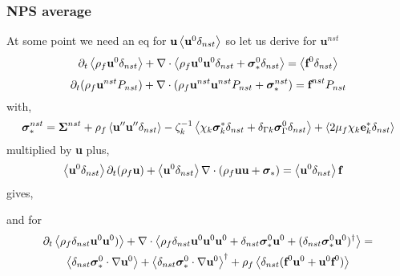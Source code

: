 \subsubsection{NPS average}

At some point we need an eq for $\textbf{u}\left<\textbf{u}^0 \delta_{nst}\right>$ so let us derive for $\textbf{u}^{nst}$
\begin{equation}
    \partial_t \left<\rho_f\textbf{u}^0\delta_{nst}\right>
    + \mathbf{\nabla}\cdot \left<\rho_f \textbf{u}^0\textbf{u}^0\delta_{nst} + \bm\sigma^0_*\delta_{nst}\right>
    = \left<\textbf{f}^0\delta_{nst}\right>
\end{equation}
\begin{equation}
    \partial_t (\rho_f\textbf{u}^{nst}P_{nst})
    + \mathbf{\nabla}\cdot (\rho_f \textbf{u}^{nst}\textbf{u}^{nst}P_{nst} + \bm\sigma^{nst}_* )
    =\textbf{f}^{nst}P_{nst}
\end{equation}
with,
\begin{equation}
    \bm\sigma^{nst}_*
    =
    \bm\Sigma^{nst}
    + \rho_f \left<\textbf{u}''\textbf{u}''\delta_{nst}\right>
    - \zeta_k^{-1} \left<\chi_k \bm\sigma_k^*\delta_{nst} + \delta_{\Gamma k} \bm\sigma_\Gamma^0\delta_{nst}\right> 
    + \left<2\mu_f \chi_k \textbf{e}_k^*\delta_{nst}\right>
\end{equation}
multiplied by \textbf{u} plus,
\begin{align*}
    \left<\textbf{u}^0 \delta_{nst}\right>\partial_t(\rho_f\textbf{u}) 
    + \left<\textbf{u}^0 \delta_{nst}\right>\mathbf{\nabla}\cdot (\rho_f \textbf{u}\textbf{u} + \bm\sigma_*)
    &= 
    \left<\textbf{u}^0 \delta_{nst}\right>\textbf{f}
\end{align*}
gives, 

and for
\begin{multline}
    \partial_t\left<\rho_f\delta_{nst}\textbf{u}^0\textbf{u}^0) \right>
    + \mathbf{\nabla}\cdot \left<\rho_f \delta_{nst}\textbf{u}^0\textbf{u}^0\textbf{u}^0
    + \delta_{nst}\bm\sigma^0_*\textbf{u}^0 + (\delta_{nst}\bm\sigma_*^0 \textbf{u}^0 )^\dagger \right>
    = \\
    \left<\delta_{nst}\bm\sigma_*^0 \cdot \mathbf{\nabla} \textbf{u}^0\right>
    +\left<\delta_{nst}\bm\sigma_*^0 \cdot \mathbf{\nabla} \textbf{u}^0\right>^\dagger
    + \rho_f \left<\delta_{nst}(\textbf{f}^0 \textbf{u}^0 + \textbf{u}^0 \textbf{f}^0)\right>
\end{multline}